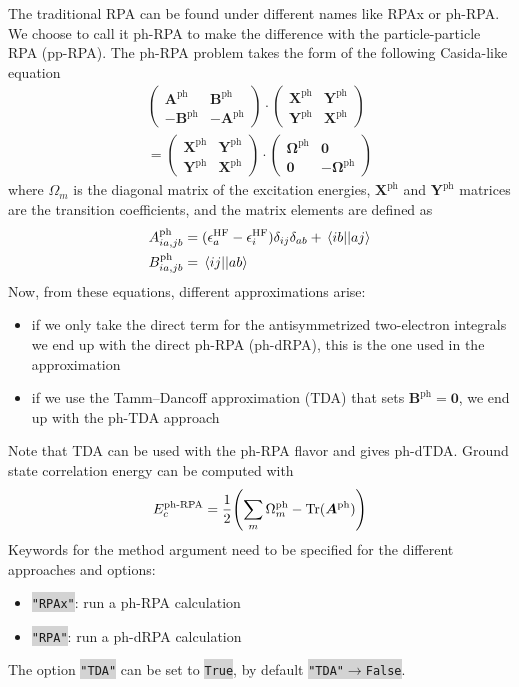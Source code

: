 \documentclass[aip,jcp,reprint,noshowkeys,superscriptaddress]{revtex4-1}
\newcommand{\GW}{\text{$GW$}}
\newcommand{\HF}{\text{HF}}
\newcommand{\ph}{\text{ph}}
\newcommand{\ep}{\epsilon}
\newcommand{\bO}{\mathbf{0}}
\newcommand{\bX}{\bm{X}}
\newcommand{\bY}{\bm{Y}}
\newcommand{\bA}{\mathbf{A}}
\newcommand{\bB}{\mathbf{B}}
\newcommand{\bOme}{\boldsymbol{\Omega}}
\newcommand{\Mat}[2]{\bm{#1}^{\text{#2}}}
\newcommand{\keyword}[1]{{\colorbox{lightgray}{\texttt{#1}}}}
\begin{document}
The traditional RPA can be found under different names like RPAx or ph-RPA. We choose to call it ph-RPA to make the difference with the particle-particle RPA (pp-RPA). The ph-RPA problem takes the form of the following Casida-like equation 
\begin{multline}
\label{eq:phRPA}
	\begin{pmatrix}
		\bA^{\ph} & \bB^{\ph} 
		\\
		- \bB^{\ph} &  -\bA^{\ph}
	\end{pmatrix}
	\cdot
	\begin{pmatrix}
		\bX^{\ph} & \bY^{\ph}
		\\
		\bY^{\ph} & \bX^{\ph}
	\end{pmatrix}
	\\
	=
	\begin{pmatrix}
		\bX^{\ph} & \bY^{\ph}
		\\
		\bY^{\ph} & \bX^{\ph}
	\end{pmatrix}
	\cdot
	\begin{pmatrix}
		\bOme^{\ph} & \bO
		\\
		\bO & -\bOme^{\ph}
	\end{pmatrix}
\end{multline} 
where $\Omega_m$ is the diagonal matrix of the excitation energies, $\bX^{\ph}$ and $\bY^{\ph}$ matrices are the transition coefficients, and the matrix elements are defined as 
\begin{align}
	A_{ia,jb}^\ph & = (\ep_{a}^{\HF} - \ep_{i}^{\HF}) \delta_{ij} \delta_{ab} + \mel{ib}{}{aj} 
	\\
	B_{ia,jb}^\ph & = \mel{ij}{}{ab} 
\end{align}
Now, from these equations, different approximations arise:
\begin{itemize}
\item if we only take the direct term for the antisymmetrized two-electron integrals we end up with the direct ph-RPA (ph-dRPA), this is the one used in the {\GW} approximation
\item if we use the Tamm–Dancoff approximation (TDA) that sets $\Mat{B}{ph}=\bm{0}$, we end up with the ph-TDA approach
\end{itemize}
Note that TDA can be used with the ph-RPA flavor and gives ph-dTDA. Ground state correlation energy can be computed with 
\begin{equation}
E_c^{\text{ph-RPA}}=\frac{1}{2} \qty(\sum_m \Omega_m^{\ph} - \text{Tr}(\bm{A}^{\ph})) 
\end{equation}
Keywords for the method argument need to be specified for the different approaches and options:
\begin{itemize}
\item \keyword{"RPAx"}: run a ph-RPA calculation
\item \keyword{"RPA"}: run a ph-dRPA calculation
\end{itemize}
The option \keyword{"TDA"} can be set to \keyword{True}, by default \keyword{"TDA"$\rightarrow$False}.
\end{document}
